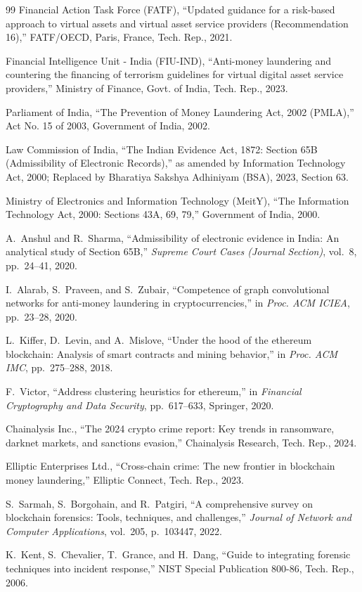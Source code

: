\documentclass[10pt,twocolumn,a4paper]{article}
\begin{document}
\begin{thebibliography}{99}
{Financial Action Task Force (FATF)}, ``Updated guidance for a risk-based approach to virtual assets and virtual asset service providers (Recommendation 16),'' FATF/OECD, Paris, France, Tech. Rep., 2021.

{Financial Intelligence Unit - India (FIU-IND)}, ``Anti-money laundering and countering the financing of terrorism guidelines for virtual digital asset service providers,'' Ministry of Finance, Govt. of India, Tech. Rep., 2023.

{Parliament of India}, ``The Prevention of Money Laundering Act, 2002 (PMLA),'' Act No. 15 of 2003, Government of India, 2002.

{Law Commission of India}, ``The Indian Evidence Act, 1872: Section 65B (Admissibility of Electronic Records),'' as amended by Information Technology Act, 2000; Replaced by Bharatiya Sakshya Adhiniyam (BSA), 2023, Section 63.

{Ministry of Electronics and Information Technology (MeitY)}, ``The Information Technology Act, 2000: Sections 43A, 69, 79,'' Government of India, 2000.

A.~Anshul and R.~Sharma, ``Admissibility of electronic evidence in India: An analytical study of Section 65B,'' \emph{Supreme Court Cases (Journal Section)}, vol.~8, pp.~24--41, 2020.

I.~Alarab, S.~Praveen, and S.~Zubair, ``Competence of graph convolutional networks for anti-money laundering in cryptocurrencies,'' in \emph{Proc. ACM ICIEA}, pp.~23--28, 2020.

L.~Kiffer, D.~Levin, and A.~Mislove, ``Under the hood of the ethereum blockchain: Analysis of smart contracts and mining behavior,'' in \emph{Proc. ACM IMC}, pp.~275--288, 2018.

F.~Victor, ``Address clustering heuristics for ethereum,'' in \emph{Financial Cryptography and Data Security}, pp.~617--633, Springer, 2020.

{Chainalysis Inc.}, ``The 2024 crypto crime report: Key trends in ransomware, darknet markets, and sanctions evasion,'' Chainalysis Research, Tech. Rep., 2024.

{Elliptic Enterprises Ltd.}, ``Cross-chain crime: The new frontier in blockchain money laundering,'' Elliptic Connect, Tech. Rep., 2023.

S.~Sarmah, S.~Borgohain, and R.~Patgiri, ``A comprehensive survey on blockchain forensics: Tools, techniques, and challenges,'' \emph{Journal of Network and Computer Applications}, vol.~205, p.~103447, 2022.

K.~Kent, S.~Chevalier, T.~Grance, and H.~Dang, ``Guide to integrating forensic techniques into incident response,'' NIST Special Publication 800-86, Tech. Rep., 2006.

\end{thebibliography}
\end{document}
